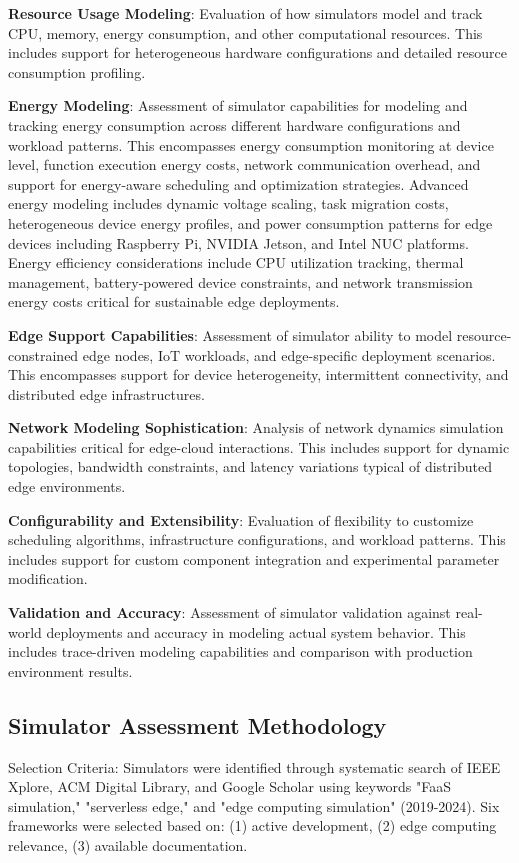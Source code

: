 \textbf{Resource Usage Modeling}: Evaluation of how simulators model and track CPU, memory, energy consumption, and other computational resources. This includes support for heterogeneous hardware configurations and detailed resource consumption profiling.

\textbf{Energy Modeling}: Assessment of simulator capabilities for modeling and tracking energy consumption across different hardware configurations and workload patterns. This encompasses energy consumption monitoring at device level, function execution energy costs, network communication overhead, and support for energy-aware scheduling and optimization strategies. Advanced energy modeling includes dynamic voltage scaling, task migration costs, heterogeneous device energy profiles, and power consumption patterns for edge devices including Raspberry Pi, NVIDIA Jetson, and Intel NUC platforms. Energy efficiency considerations include CPU utilization tracking, thermal management, battery-powered device constraints, and network transmission energy costs critical for sustainable edge deployments.

\textbf{Edge Support Capabilities}: Assessment of simulator ability to model resource-constrained edge nodes, IoT workloads, and edge-specific deployment scenarios. This encompasses support for device heterogeneity, intermittent connectivity, and distributed edge infrastructures.

\textbf{Network Modeling Sophistication}: Analysis of network dynamics simulation capabilities critical for edge-cloud interactions. This includes support for dynamic topologies, bandwidth constraints, and latency variations typical of distributed edge environments.

\textbf{Configurability and Extensibility}: Evaluation of flexibility to customize scheduling algorithms, infrastructure configurations, and workload patterns. This includes support for custom component integration and experimental parameter modification.

\textbf{Validation and Accuracy}: Assessment of simulator validation against real-world deployments and accuracy in modeling actual system behavior. This includes trace-driven modeling capabilities and comparison with production environment results.

\subsection{Simulator Assessment Methodology}
Selection Criteria: Simulators were identified through systematic search of IEEE Xplore, ACM Digital Library, and Google Scholar using keywords "FaaS simulation," "serverless edge," and "edge computing simulation" (2019-2024). Six frameworks were selected based on: (1) active development, (2) edge computing relevance, (3) available documentation.

